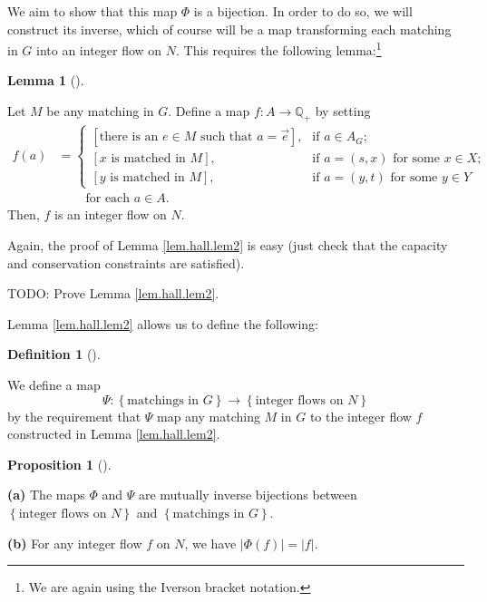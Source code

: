 \documentclass[numbers=enddot,12pt,final,onecolumn,notitlepage]{scrartcl}%
\theoremstyle{definition}
\newtheorem{lem}[theo]{Lemma}
\newenvironment{lemma}[1][]
{\begin{lem}[#1]\begin{leftbar}}
{\end{leftbar}\end{lem}}
\newtheorem{prop}[theo]{Proposition}
\newenvironment{proposition}[1][]
{\begin{prop}[#1]\begin{leftbar}}
{\end{leftbar}\end{prop}}
\newtheorem{defi}[theo]{Definition}
\newenvironment{definition}[1][]
{\begin{defi}[#1]\begin{leftbar}}
{\end{leftbar}\end{defi}}
\begin{document}
We aim to show that this map $\Phi$ is a bijection. In order to do so, we will
construct its inverse, which of course will be a map transforming each
matching in $G$ into an integer flow on $N$. This requires the following
lemma:\footnote{We are again using the Iverson bracket notation.}

\begin{lemma}
\label{lem.hall.lem2}Let $M$ be any matching in $G$. Define a map
$f:A\rightarrow\mathbb{Q}_{+}$ by setting%
\begin{align*}
f\left(  a\right)   &  =%
\begin{cases}
\left[  \text{there is an }e\in M\text{ such that }a=\overrightarrow{e}%
\right]  , & \text{if }a\in A_{G};\\
\left[  x\text{ is matched in }M\right]  , & \text{if }a=\left(  s,x\right)
\text{ for some }x\in X;\\
\left[  y\text{ is matched in }M\right]  , & \text{if }a=\left(  y,t\right)
\text{ for some }y\in Y
\end{cases}
\\
&  \ \ \ \ \ \ \ \ \ \ \text{for each }a\in A.
\end{align*}
Then, $f$ is an integer flow on $N$.
\end{lemma}

Again, the proof of Lemma \ref{lem.hall.lem2} is easy (just check that the
capacity and conservation constraints are satisfied).

TODO: Prove Lemma \ref{lem.hall.lem2}.

Lemma \ref{lem.hall.lem2} allows us to define the following:

\begin{definition}
We define a map
\[
\Psi:\left\{  \text{matchings in }G\right\}  \rightarrow\left\{  \text{integer
flows on }N\right\}
\]
by the requirement that $\Psi$ map any matching $M$ in $G$ to the integer flow
$f$ constructed in Lemma \ref{lem.hall.lem2}.
\end{definition}

\begin{proposition}
\label{prop.hall.inverse}\textbf{(a)} The maps $\Phi$ and $\Psi$ are mutually
inverse bijections between $\left\{  \text{integer flows on }N\right\}  $ and
$\left\{  \text{matchings in }G\right\}  $.

\textbf{(b)} For any integer flow $f$ on $N$, we have $\left\vert \Phi\left(
f\right)  \right\vert =\left\vert f\right\vert $.
\end{proposition}
\end{document}
